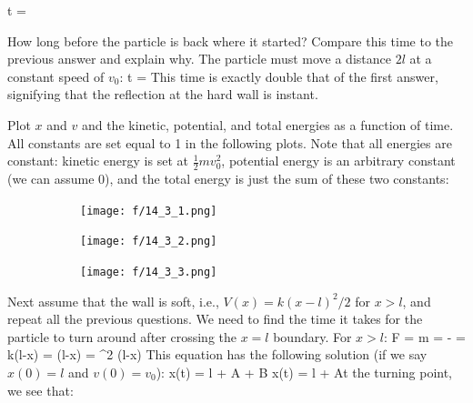 \be
t = 
\ee
\item How long before the particle is back where it started? Compare this time
to the previous answer and explain why.
\newline The particle must move a distance $2l$ at a constant speed of $v_0$:
\be
t = 
\ee
This time is exactly double that of the first answer, signifying that the reflection at the hard wall is instant.
\item Plot $x$ and $v$ and the kinetic, potential, and total energies as a function of time.
\newline All constants are set equal to 1 in the following plots. Note that all energies are constant: kinetic energy is set at $\frac{1}{2}mv_0^2$, potential energy is an arbitrary constant (we can assume 0), and the total energy is just the sum of these two constants:
\begin{figure}[h!]
\begin{center}
\begin{subfigure}[h]{.30\textwidth}
    \begin{center}
    \texttt{[image: f/14\_3\_1.png]}
    \end{center}
\end{subfigure}
\begin{subfigure}[h]{.30\textwidth}
    \begin{center}
    \texttt{[image: f/14\_3\_2.png]}
    \end{center}
\end{subfigure}
\begin{subfigure}[h]{.32\textwidth}
    \begin{center}
    \texttt{[image: f/14\_3\_3.png]}
    \end{center}
\end{subfigure}
\end{center}
\end{figure}
\item Next assume that the wall is soft, i.e., $V(x) = k(x-l)^2/2 $ for $x>l$,
and
repeat all the previous questions.
\newline We need to find the time it takes for the particle to turn around after crossing the $x=l$ boundary. For $x>l$:
\be
F = m = - = k(l-x) \thus {} = (l-x) = \omega^2 (l-x)
\ee
This equation has the following solution (if we say $x(0) = l$ and $v(0) = v_0$):
\be
x(t) = l + A + B \thus x(t) = l + 
\ee
At the turning point, we see that:
